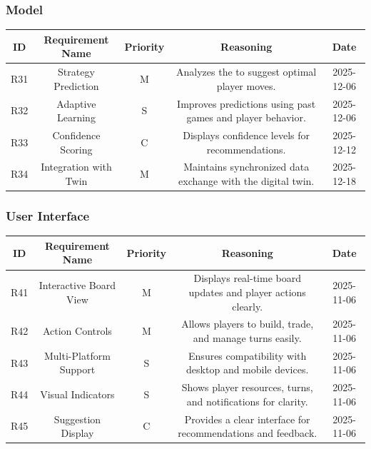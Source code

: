\documentclass{article}
\begin{document}
\vspace{1em}

\subsubsection*{\AI{} Model}

\begin{tabular}{|c|c|c|c|c|}
\hline
\textbf{ID} & \textbf{Requirement Name} & \textbf{Priority} &
\textbf{Reasoning} & \textbf{Date} \\
\hline
R31 & Strategy Prediction & M &
\parbox[t]{4cm}{Analyzes the \GameState{} to suggest optimal player
moves.} &
2025-12-06 \\
\hline
R32 & Adaptive Learning & S &
\parbox[t]{4cm}{Improves predictions using past games and player
behavior.} &
2025-12-06 \\
\hline
R33 & Confidence Scoring & C &
\parbox[t]{4cm}{Displays confidence levels for \AI{} recommendations.} &
2025-12-12 \\
\hline
R34 & Integration with Twin & M &
\parbox[t]{4cm}{Maintains synchronized data exchange with the digital
twin.} &
2025-12-18 \\
\hline

\end{tabular}

\vspace{1em}

\subsubsection*{User Interface}

\begin{tabular}{|c|c|c|c|c|}
\hline
\textbf{ID} & \textbf{Requirement Name} & \textbf{Priority} &
\textbf{Reasoning} & \textbf{Date} \\
\hline
R41 & Interactive Board View & M &
\parbox[t]{4cm}{Displays real-time board updates and player actions
clearly.} &
2025-11-06 \\
\hline
R42 & Action Controls & M &
\parbox[t]{4cm}{Allows players to build, trade, and manage turns
easily.} &
2025-11-06 \\
\hline
R43 & Multi-Platform Support & S &
\parbox[t]{4cm}{Ensures compatibility with desktop and mobile
devices.} &
2025-11-06 \\
\hline
R44 & Visual Indicators & S &
\parbox[t]{4cm}{Shows player resources, turns, and notifications for
clarity.} &
2025-11-06 \\
\hline
R45 & \AI{} Suggestion Display & C &
\parbox[t]{4cm}{Provides a clear interface for \AI{} recommendations
and feedback.} &
2025-11-06 \\
\hline
\end{tabular}
\end{document}
